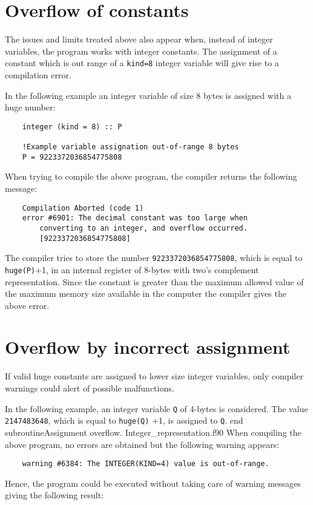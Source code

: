     \newpage
    \section{Overflow of constants}
        
The issues and limits treated above also appear when, instead of integer variables, the program works 
with integer constants. 
The assignment of a constant which is out range of a \texttt{kind=8} integer variable 
will give rise to a compilation error.

In the following example an integer variable of size 8 bytes is assigned with a huge number: 
\begin{verbatim}
    integer (kind = 8) :: P
   
    !Example variable assignation out-of-range 8 bytes
    P = 9223372036854775808
\end{verbatim}
When trying to compile the above program, the compiler returns the following message: 
\begin{verbatim}
    Compilation Aborted (code 1)
    error #6901: The decimal constant was too large when 
        converting to an integer, and overflow occurred.
        [9223372036854775808]
\end{verbatim}
The compiler tries to store the number \texttt{9223372036854775808}, which is equal to \texttt{huge(P)}+1,
in an internal register of 8-bytes with two's complement representation. Since the constant is greater than 
the maximum allowed value of the maximum memory size available in the computer the compiler gives the above error. 


\newpage
    \section{Overflow by incorrect assignment}

If valid huge constants are assigned to lower size integer variables, only compiler warnings could alert 
of possible malfunctions.  
  
In the following example, an integer variable \texttt{Q} of 4-bytes is considered. 
The value \texttt{2147483648}, which is equal to \texttt{huge(Q)} +1, is assigned 
to \texttt{Q}. 
\vspace{0.5cm}
{end subroutine}{Assignment overflow. Integer_representation.f90}
When compiling the above program, no errors are obtained but the following warning appears: 
\begin{verbatim}
    warning #6384: The INTEGER(KIND=4) value is out-of-range.	
\end{verbatim}
Hence, the program  could be executed without taking care of warning messages giving the following result: 

